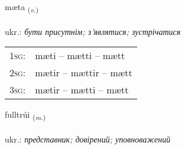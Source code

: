 \documentclass[frontgrid, backgrid]{flacards}\usepackage[]{graphicx}\usepackage[]{xcolor}
\begin{document}
\renewcommand{\flhead}{\vskip5pt \fboxsep=0pt {\small\bfseries\footnotesize Sagnorð | дієслово}}
\renewcommand{\fcfoot}{\vskip5pt \fboxsep=0pt \hspace{2pt}{\small\bfseries\footnotesize 1K}}

\renewcommand{\blhead}{\vskip5pt {\small\bfseries\footnotesize Sagnorð | дієслово }}
\renewcommand{\bcfoot}{\vskip5pt \hspace{2pt}{\small\bfseries\footnotesize 1K}}


{mæta \small{\textsubscript{(\textit{v.})}} \\[1ex] %
\textphonetic{[maiːta]} \\
ukr.: \emph{бути присутнім; з'являтися; зустрічатися} \\  [2ex]
\renewcommand*{\arraystretch}{0.8}
\begin{tabular}{p{1cm}l}
\textsc{1sg}: & mæti -- mætti -- mætt \\ 
\textsc{2sg}: & mætir -- mættir -- mætt \\ 
\textsc{3sg}: & mætir -- mætti -- mætt \\ 
\end{tabular}
}

\renewcommand{\flhead}{\vskip5pt \fboxsep=0pt {\small\bfseries\footnotesize Nafnorð | іменник}}
\renewcommand{\fcfoot}{\vskip5pt \fboxsep=0pt \hspace{2pt}{\small\bfseries\footnotesize 1K}}

\renewcommand{\blhead}{\vskip5pt {\small\bfseries\footnotesize Nafnorð | іменник }}
\renewcommand{\bcfoot}{\vskip5pt \hspace{2pt}{\small\bfseries\footnotesize 1K}}


{fulltrúi \small{\textsubscript{(\textit{m.})}} \\[1ex] %
 \\
ukr.: \emph{представник; довірений; уповноважений} \\  [2ex]
\renewcommand*{\arraystretch}{0.8}
}
\end{document}
